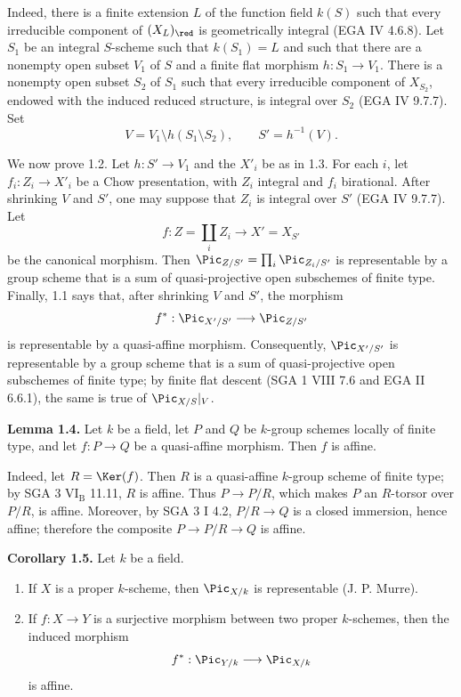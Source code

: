 Indeed, there is a finite extension $L$ of the function field $k(S)$ such
that every irreducible component of $(X_L)_{\red}$ is geometrically integral
(EGA IV 4.6.8). Let $S_1$ be an integral $S$-scheme such that $k(S_1)=L$ and
such that there are a nonempty open subset $V_1$ of $S$ and a finite flat
morphism $h:S_1\to V_1$. There is a nonempty open subset $S_2$ of $S_1$ such
that every irreducible component of $X_{S_2}$, endowed with the induced
reduced structure, is integral over $S_2$ (EGA IV 9.7.7). Set
\[
  V=V_1\setminus h(S_1\setminus S_2),\qquad S'=h^{-1}(V).
\]

We now prove 1.2. Let $h:S'\to V_1$ and the $X'_i$ be as in 1.3. For each
$i$, let $f_i:Z_i\to X'_i$ be a Chow presentation, with $Z_i$ integral and
$f_i$ birational. After shrinking $V$ and $S'$, one may suppose that $Z_i$
is integral over $S'$ (EGA IV 9.7.7). Let
\[
  f:Z=\coprod_i Z_i\longrightarrow X'=X_{S'}
\]
be the canonical morphism. Then
$\Pic_{Z/S'}=\prod_i\Pic_{Z_i/S'}$ is representable by a group scheme that is
a sum of quasi-projective open subschemes of finite type. Finally, 1.1 says
that, after shrinking $V$ and $S'$, the morphism
\[
  f^*:\Pic_{X'/S'}\longrightarrow\Pic_{Z/S'}
\]
is representable by a quasi-affine morphism. Consequently,
$\Pic_{X'/S'}$ is representable by a group scheme that is a sum of
quasi-projective open subschemes of finite type; by finite flat descent
(SGA 1 VIII 7.6 and EGA II 6.6.1), the same is true of
$\Pic_{X/S}|_V$.

\textbf{Lemma 1.4.} Let $k$ be a field, let $P$ and $Q$ be $k$-group schemes
locally of finite type, and let $f:P\to Q$ be a quasi-affine morphism. Then
$f$ is affine.

Indeed, let $R=\Ker(f)$. Then $R$ is a quasi-affine $k$-group scheme of
finite type; by SGA 3 $\mathrm{VI}_{\mathrm B}$ 11.11, $R$ is affine.
Thus $P\to P/R$, which makes $P$ an $R$-torsor over $P/R$, is affine.
Moreover, by SGA 3 I 4.2, $P/R\to Q$ is a closed immersion, hence affine;
therefore the composite $P\to P/R\to Q$ is affine.

\textbf{Corollary 1.5.} Let $k$ be a field.
\begin{enumerate}[label=\alph*)]
\item If $X$ is a proper $k$-scheme, then $\Pic_{X/k}$ is representable
  (J. P. Murre).
\item If $f:X\to Y$ is a surjective morphism between two proper $k$-schemes,
  then the induced morphism
  \[
    f^*:\Pic_{Y/k}\longrightarrow\Pic_{X/k}
  \]
  is affine.
\end{enumerate}

